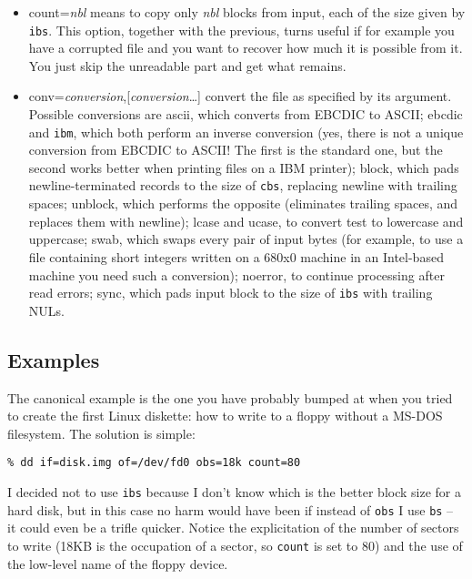 \begin{itemize}
\item {\sf count={\em nbl\/}} means to copy only {\em nbl\/} blocks from
input, each of the size given by {\tt ibs}. This option, together with the
previous, turns useful if for example you have a corrupted file and you
want to recover how much it is possible from it. You just skip the
unreadable part and get what remains.

\item {\sf conv={\em conversion\/},[{\em conversion\/}\ldots]} convert the
file as specified by its argument. Possible conversions are {\sf ascii},
which converts from EBCDIC to ASCII; {\sf ebcdic} and {\tt ibm}, which both
perform an inverse conversion (yes, there is not a unique conversion from
EBCDIC to ASCII\@! The first is the standard one, but the second works
better when printing files on a IBM printer); {\sf block}, which pads
newline-terminated records to the size of {\tt cbs}, replacing newline with 
trailing spaces; {\sf unblock}, which performs the opposite (eliminates
trailing spaces, and replaces them with newline); {\sf lcase} and {\sf
ucase}, to convert test to lowercase and uppercase; {\sf swab}, which
swaps every pair of input bytes (for example, to use a file containing
short integers written on a 680x0 machine in an Intel-based machine you
need such a conversion); {\sf noerror}, to continue processing after read
errors; {\sf sync}, which pads input block to the size of {\tt ibs} with
trailing NULs.

\end{itemize}

\subsection{Examples}

The canonical example is the one you have probably bumped at when you
tried to create the first Linux diskette: how to write to a floppy without a
MS-DOS filesystem. The solution is simple:
\begin{verbatim}
% dd if=disk.img of=/dev/fd0 obs=18k count=80
\end{verbatim}
I decided not to use {\tt ibs} because I don't know which is the better
block size for a hard disk, but in this case no harm would have been if
instead of {\tt obs} I use {\tt bs} -- it could even be a trifle
quicker. Notice the explicitation of the number of sectors to write (18KB
is the occupation of a sector, so {\tt count} is set to 80) and the use of
the low-level name of the floppy device.

